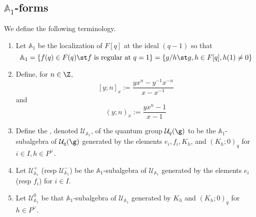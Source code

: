 \documentclass[11pt,leqno,oneside]{amsart}
\numberwithin{thm}{section}
\newcommand{\weightlattice}{P}
\newcommand{\U}{\mathcal{U}}
\newcommand{\A}{\mathbb{A}}
\begin{document}
\subsection{\(\A_1\)-forms}
\begin{defn}
  We define the following terminology.
  \begin{enumerate}
  \item  Let \(\A_1\) be the localization of \(F[q]\) at the ideal \((q-1)\)
  so that \[
    \A_1 = \{f(q) \in F(q) \st f \text{ is regular at }q=1\} = \{g/h
    \st g,h \in F[q], h(1) \neq 0\}
  \]
  \item Define, for \(n \in \Z\), \[
    [y;n]_x := \frac{yx^n-y^{-1}x^{-n}}{x-x^{-1}}
  \]
  and \[
    (y;n)_x := \frac{yx^n-1}{x-1}
  \]
  \item Define the \de{\(\A_1\)-form}, denoted \(\U_{\A_1}\), of the
    quantum group \(\U_q(\g)\) to be the \(\A_1\)-subalgebra of
    \(\U_q(\g)\) generated by the elements \(e_i, f_i, K_h\), and
    \((K_h;0)_q\) for \(i \in I, h \in \weightlattice^\vee\).
  \item Let \(\U_{\A_1}^+\) (resp \(\U_{\A_1}^-\)) be the
    \(\A_1\)-subalgebra of \(\U_{\A_1}\) generated by the elements
    \(e_i\) (resp \(f_i\)) for \(i \in I\).
  \item Let \(\U_{\A_1}^0\) be that \(\A_1\)-subalgebra of
    \(\U_{\A_1}\) generated by \(K_h\) and \((K_h;0)_q\) for \(h \in
    \weightlattice^\vee\). 
  \end{enumerate}
\end{defn}

\begin{bibdiv}
  \begin{biblist}
  \end{biblist}
\end{bibdiv}
\end{document}
